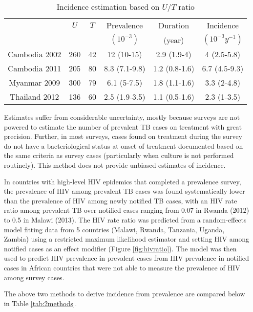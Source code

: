 \begin{table}
\label{tab:method2}
    \begin{tabular}{ c c c c c c }
    \hline
         & $U$ & $T$ & Prevalence & Duration & Incidence \\ 
         &     &     & $(10^{-3})$ & (year)    & $(10^{-3}y^{-1})$ \\
     \hline
        Cambodia 2002 & 260 & 42 & 12 (10-15) & 2.9 (1.9-4) & 4 (2.5-5.8) \\ 
        Cambodia 2011 & 205 & 80 & 8.3 (7.1-9.8) & 1.2 (0.8-1.6) & 6.7 (4.5-9.3) \\ 
        Myanmar 2009 & 300 & 79 & 6.1 (5-7.5) & 1.8 (1.1-1.6) & 3.3 (2-4.8) \\ 
        Thailand 2012 & 136 & 60 & 2.5 (1.9-3.5) & 1.1 (0.5-1.6) & 2.3 (1-3.5) \\ 
    \hline
    \end{tabular} 
    \caption{Incidence estimation based on $U/T$ ratio
} 
\end{table}

Estimates suffer from considerable uncertainty, mostly because surveys are not powered to estimate the number of prevalent TB cases on treatment with great precision. Further, in most surveys, cases found on treatment during the survey do not have a bacteriological status at onset of treatment documented based on the same criteria as survey cases (particularly when culture is not performed routinely). This method does not provide unbiased estimates of incidence. 

In countries with high-level HIV epidemics that completed a prevalence survey, the prevalence of HIV among prevalent TB cases was found systematically lower than the prevalence of HIV among newly notified TB cases, with an HIV rate ratio among prevalent TB over notified cases ranging from 0.07 in Rwanda (2012) to 0.5 in Malawi (2013). The HIV rate ratio was predicted from a random-effects model fitting data from 5 countries (Malawi, Rwanda, Tanzania, Uganda, Zambia) using a restricted maximum likelihood estimator and setting HIV among notified cases as an effect modifier (Figure \ref{fig:hivratio}). The model was then used to predict HIV prevalence in prevalent cases from HIV prevalence in notified cases in African countries that were not able to measure the prevalence of HIV among survey cases.

The above two methods to derive incidence from prevalence are compared below in Table \ref{tab:2methods}.

